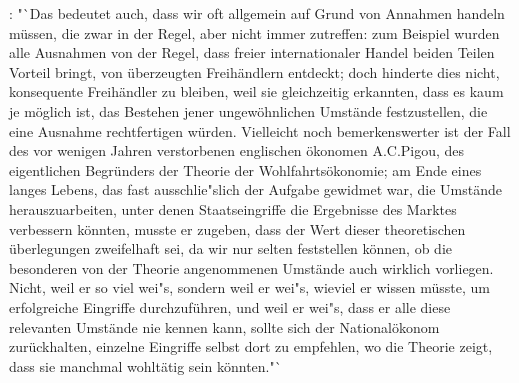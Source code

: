 \documentclass[
    onecolumn,
    a4paper,
    abstracton,
    parskip=half
    ,final
    ]{scrartcl}
\begin{document}
\citep[vgl.][S.13]{Hayek1969}: "`Das bedeutet auch, dass wir oft allgemein auf Grund von Annahmen handeln m{\"u}ssen, die zwar in der Regel, aber nicht immer zutreffen: zum Beispiel wurden alle Ausnahmen von der Regel, dass freier internationaler Handel beiden Teilen Vorteil bringt, von {\"u}berzeugten Freih{\"a}ndlern entdeckt; doch hinderte dies nicht, konsequente Freih{\"a}ndler zu bleiben, weil sie gleichzeitig erkannten, dass es kaum je m{\"o}glich ist, das Bestehen jener ungew{\"o}hnlichen Umst{\"a}nde festzustellen, die eine Ausnahme rechtfertigen w{\"u}rden. Vielleicht noch bemerkenswerter ist der Fall des vor wenigen Jahren verstorbenen englischen {\"o}konomen A.C.Pigou, des eigentlichen Begr{\"u}nders der Theorie der Wohlfahrts{\"o}konomie; am Ende eines langes Lebens, das fast ausschlie{"s}lich der Aufgabe gewidmet war, die Umst{\"a}nde herauszuarbeiten, unter denen Staatseingriffe die Ergebnisse des Marktes verbessern k{\"o}nnten, musste er zugeben, dass der Wert dieser theoretischen {\"u}berlegungen zweifelhaft sei, da wir nur selten feststellen k{\"o}nnen, ob die besonderen von der Theorie angenommenen Umst{\"a}nde auch wirklich vorliegen. Nicht, weil er so viel wei{"s}, sondern weil er wei{"s}, wieviel er wissen m{\"u}sste, um erfolgreiche Eingriffe durchzuf{\"u}hren, und weil er wei{"s}, dass er alle diese relevanten Umst{\"a}nde nie kennen kann, sollte sich der National{\"o}konom zur{\"u}ckhalten, einzelne Eingriffe selbst dort zu empfehlen, wo die Theorie zeigt, dass sie manchmal wohlt{\"a}tig sein k{\"o}nnten."`
\end{document}
